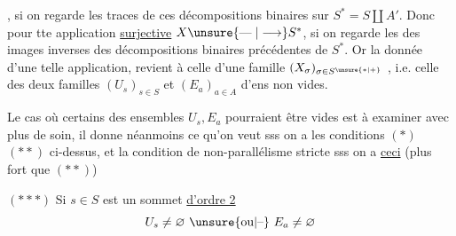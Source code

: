 , si on regarde les traces de ces décompositions binaires sur $S^\ast=S\amalg A'$. Donc pour tte application \uline{surjective} $X\unsure{\mathrel{\text{---}}|\longrightarrow}S^\ast$, si on regarde les des images inverses des décompositions binaires précédentes de $S^\ast$. Or la donnée d'une telle application, revient à celle d'une famille $(X_\sigma)_{\sigma\in S^{\unsure{\ast|+}}}$ , i.e.  celle des deux familles $(U_s)_{s\in S}$ et $(E_a)_{a\in A}$ d'ens non vides.

Le cas où certains des ensembles $U_s,E_a$ pourraient être vides est à examiner avec plus de soin, il donne néanmoins ce qu'on veut sss on a les conditions $(\ast)$ $(\ast\ast)$ ci-dessus, et la condition de non-parallélisme stricte sss on a \uline{ceci} (plus fort que $(\ast\ast)$)

$(\ast\ast\ast)$ Si $s\in S$ est un sommet \uline{d'ordre 2}    
\[
U_s\ne\varnothing\ \unsure{\text{ou}|\text{--}}\ E_a\ne\varnothing
\]
